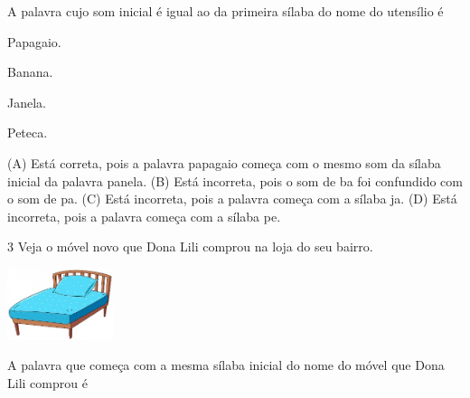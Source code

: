 
A palavra cujo som inicial é igual ao da primeira sílaba do nome do utensílio é

\begin{minipage}{.5\textwidth}
\begin{escolha}
\item Papagaio.

\item Banana.

\item Janela.

\item Peteca.
\end{escolha}
\end{minipage}

(A) Está correta, pois a palavra papagaio começa com o mesmo som da
sílaba inicial da palavra panela.
(B) Está incorreta, pois o som de ba foi confundido com o som de pa.
(C) Está incorreta, pois a palavra começa com a sílaba ja.
(D) Está incorreta, pois a palavra começa com a sílaba pe.

\num{3} Veja o móvel novo que Dona Lili comprou na loja do seu bairro.

\includegraphics[width=1.22293in,height=0.81839in]{media/image140.jpeg}


A palavra que começa com a mesma sílaba inicial do nome do móvel que Dona Lili comprou é

